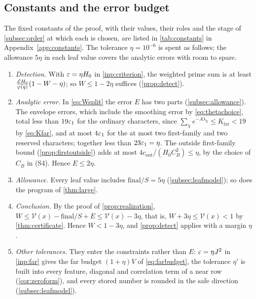 \subsection{Constants and the error budget}\label{subsec:budget}
The fixed constants of the proof, with their values, their roles and the stage of
\cref{subsec:order} at which each is chosen, are listed in \cref{tab:constants} in
Appendix~\ref{app:constants}. The tolerance $\eta=10^{-6}$ is spent as follows; the allowance $5\eta$ in each leaf value covers
the analytic errors with room to spare.
\begin{enumerate}[(1)]
  \item \emph{Detection.} With $\varepsilon=\eta H_0$ in \cref{inp:criterion}, the weighted prime sum is at
    least $\frac{\mathcal{L} H_0}{\varphi(q)}(1-W-\eta)$; so $W\le1-2\eta$ suffices (\cref{prop:detect}).
  \item \emph{Analytic error.} In \eqref{eq:Wsplit} the error $E$ has two parts
    (\cref{subsec:allowance}). The envelope errors, which include the smoothing error by
    \eqref{eq:thetachoice}, total less than $19\varepsilon_1$ for the ordinary characters, since
    $\sum_\chi e^{-A\lambda_\chi}\le K_{\mathrm{far}}<19$ by \eqref{eq:Kfar}, and at most $4\varepsilon_1$ for
    the at most two first-family and two reserved characters; together less than $23\varepsilon_1=\eta$.
    The outside first-family bound (\cref{prop:firstoutside}) adds at most
    $4c_{\mathrm{out}}/(H_0C_B^2)\le\eta$, by the choice of $C_B$ in (S4). Hence $E\le2\eta$.
  \item \emph{Allowance.} Every leaf value includes $\mathrm{final}/S=5\eta$
    (\cref{subsec:leafmodel}); so does the program of \cref{thm:large}.
  \item \emph{Conclusion.} By the proof of \cref{prop:realization},
    $W\le\mathcal V(x)-\mathrm{final}/S+E\le\mathcal V(x)-3\eta$, that is, $W+3\eta\le\mathcal V(x)<1$
    by \cref{thm:certificate}. Hence $W<1-3\eta$, and \cref{prop:detect} applies with a margin $\eta$.
  \item \emph{Other tolerances.} They enter the constraints rather than $E$: $\varepsilon=\eta J^2$ in
    \cref{inp:far} gives the far budget $(1+\eta)V$ of \eqref{eq:farbudget}, the tolerance $\eta'$ is
    built into every feature, diagonal and correlation term of a near row (\cref{cor:zeroform}), and every
    stored number is rounded in the safe direction (\cref{subsec:leafmodel}).
\end{enumerate}
